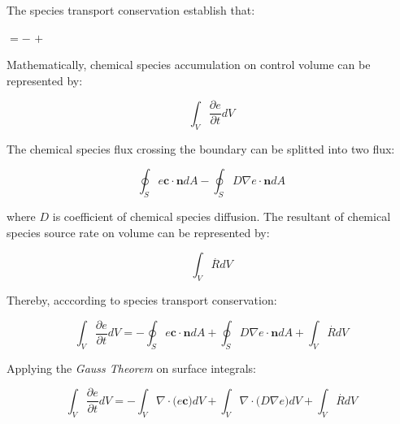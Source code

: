 The species transport conservation establish that:

\medskip
\begin{center}
           $= -$ 
           $+$ 
\end{center}

\medskip
Mathematically, chemical species accumulation on control volume
can be represented by:

\begin{equation} \label{esp 1} 
 \int_{V} \frac{\partial e}{\partial t} dV
\end{equation}

\medskip
The chemical species flux crossing the boundary
can be splitted into two flux:

\begin{equation}  
 \oint_{S} e \textbf{c} \cdot \textbf{n} dA
 -
 \oint_{S} D \nabla e \cdot \textbf{n} dA
\end{equation}

\medskip
\noindent
where $D$ is coefficient of chemical species diffusion. 
The resultant of chemical species source rate
on volume can be represented by:

\begin{equation} 
 \int_{V} \overset{.}{R} dV
\end{equation}

\medskip
\noindent
Thereby, acccording to species transport conservation:

\begin{equation}
 \int_{V} \frac{\partial e}{\partial t} dV
 = 
 - 
 \oint_{S} e \textbf{c} \cdot \textbf{n} dA
 +
 \oint_{S} D \nabla e \cdot \textbf{n} dA
 +
 \int_{V} \overset{.}{R} dV
\end{equation}

\medskip
\noindent
Applying the \textit{Gauss Theorem} on surface integrals:

\begin{equation}
 \int_{V} \frac{\partial e}{\partial t} dV
 = 
 - 
 \int_{V} \nabla \cdot \big( e \textbf{c} \big) dV
 +
 \int_{V} \nabla \cdot \big( D \nabla e \big) dV
 +
 \int_{V} \overset{.}{R} dV
\end{equation}

